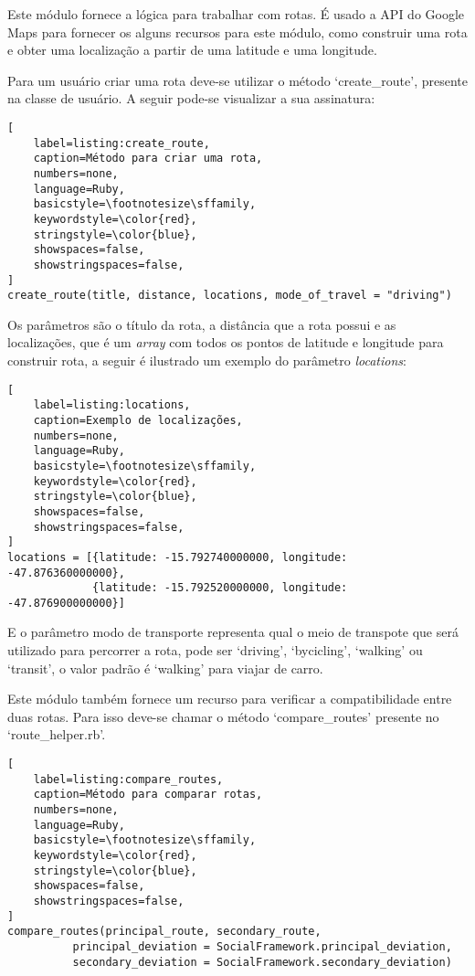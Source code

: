 Este módulo fornece a lógica para trabalhar com rotas. É usado a API do Google Maps para fornecer os alguns recursos para este módulo, como construir uma rota e obter uma localização a partir de uma latitude e uma longitude.

Para um usuário criar uma rota deve-se utilizar o método `create\_route', presente na classe de usuário. A seguir pode-se visualizar a sua assinatura:

\begin{lstlisting}[
    label=listing:create_route,
    caption=Método para criar uma rota,
    numbers=none,
    language=Ruby,
    basicstyle=\footnotesize\sffamily,
    keywordstyle=\color{red},
    stringstyle=\color{blue},
    showspaces=false,
    showstringspaces=false,
]
create_route(title, distance, locations, mode_of_travel = "driving")
\end{lstlisting}


Os parâmetros são o título da rota, a distância que a rota possui e as localizações, que é um \textit{array} com todos os pontos de latitude e longitude para construir rota, a seguir é ilustrado um exemplo do parâmetro \textit{locations}:

\begin{lstlisting}[
    label=listing:locations,
    caption=Exemplo de localizações,
    numbers=none,
    language=Ruby,
    basicstyle=\footnotesize\sffamily,
    keywordstyle=\color{red},
    stringstyle=\color{blue},
    showspaces=false,
    showstringspaces=false,
]
locations = [{latitude: -15.792740000000, longitude: -47.876360000000},
             {latitude: -15.792520000000, longitude: -47.876900000000}]
\end{lstlisting}

E o parâmetro modo de transporte  representa qual o meio de transpote que será utilizado para percorrer a rota, pode ser `driving', `bycicling', `walking' ou `transit', o valor padrão é `walking' para viajar de carro.

Este módulo também fornece um recurso para verificar a compatibilidade entre duas rotas. Para isso deve-se chamar o método `compare\_routes' presente no `route\_helper.rb'.

\begin{lstlisting}[
    label=listing:compare_routes,
    caption=Método para comparar rotas,
    numbers=none,
    language=Ruby,
    basicstyle=\footnotesize\sffamily,
    keywordstyle=\color{red},
    stringstyle=\color{blue},
    showspaces=false,
    showstringspaces=false,
]
compare_routes(principal_route, secondary_route,
          principal_deviation = SocialFramework.principal_deviation,
          secondary_deviation = SocialFramework.secondary_deviation)
\end{lstlisting}

